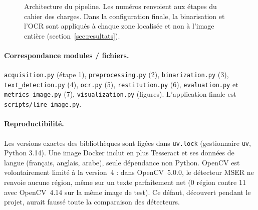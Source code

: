 \documentclass[11pt,a4paper]{article}
\newcommand{\fichier}[1]{\texttt{#1}}
\begin{document}
\begin{figure}[htbp]
\centering
{}
\caption{Architecture du pipeline. Les numéros renvoient aux étapes du cahier des charges. Dans la configuration finale, la binarisation et l'OCR sont appliqués à chaque zone localisée et non à l'image entière (section~\ref{sec:resultats}).}
\label{fig:pipeline}
\end{figure}

\paragraph{Correspondance modules / fichiers.}
\fichier{acquisition.py} (étape 1), \fichier{preprocessing.py} (2), \fichier{binarization.py} (3), \fichier{text\_detection.py} (4), \fichier{ocr.py} (5), \fichier{restitution.py} (6), \fichier{evaluation.py} et \fichier{metrics\_image.py} (7), \fichier{visualization.py} (figures). L'application finale est \fichier{scripts/lire\_image.py}.

\paragraph{Reproductibilité.}
Les versions exactes des bibliothèques sont figées dans \fichier{uv.lock} (gestionnaire \texttt{uv}, Python 3.14). Une image Docker inclut en plus Tesseract et ses données de langue (français, anglais, arabe), seule dépendance non Python. OpenCV est volontairement limité à la version~4 : dans OpenCV~5.0.0, le détecteur MSER ne renvoie aucune région, même sur un texte parfaitement net (0 région contre 11 avec OpenCV~4.14 sur la même image de test). Ce défaut, découvert pendant le projet, aurait faussé toute la comparaison des détecteurs.
\end{document}
